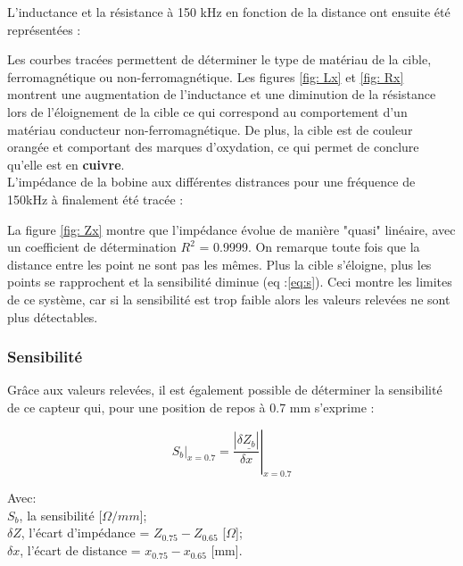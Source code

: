 L'inductance et la résistance à 150 kHz en fonction de la distance ont ensuite été représentées :


Les courbes tracées permettent de déterminer le type de matériau de la cible, ferromagnétique ou 
non-ferromagnétique. Les figures \ref{fig: Lx} et \ref{fig: Rx} montrent une augmentation de 
l'inductance et une diminution de la résistance lors de l'éloignement de la cible ce qui correspond 
au comportement d'un matériau conducteur non-ferromagnétique. 
De plus, la cible est de couleur orangée et comportant des marques d'oxydation, ce qui permet 
de conclure qu'elle est en \textbf{cuivre}.\\  



L'impédance de la bobine aux différentes distrances pour une fréquence de 150kHz à finalement été tracée :


La figure \ref{fig: Zx} montre que l'impédance évolue de manière "quasi" linéaire, avec un coefficient 
de détermination $R^2$ = 0.9999. On remarque toute fois que la distance entre les point ne sont pas les mêmes. 
Plus la cible s'éloigne, plus les points se rapprochent et la sensibilité diminue (eq :\ref{eq:s}).
Ceci montre les limites de ce système, car si la sensibilité est trop faible alors les valeurs relevées
ne sont plus détectables.
\subsubsection{Sensibilité}

Grâce aux valeurs relevées, il est également possible de déterminer la sensibilité de
ce capteur qui, pour une position de repos à 0.7 mm s'exprime : 

\begin{equation}\label{eq:s}
    \left . S_b \right |_{x=0.7} = \left . \frac{\left | \delta \underline{Z_b}\right |}{\delta x} \right |_{x=0.7}
\end{equation}

Avec: \\
$S_b$, la sensibilité [$\Omega/mm$];\\
$\delta Z$, l'écart d'impédance = $Z_{0.75} - Z_{0.65}$ [$\Omega$];\\
$\delta x$, l'écart de distance  = $x_{0.75} - x_{0.65}$ [mm].



